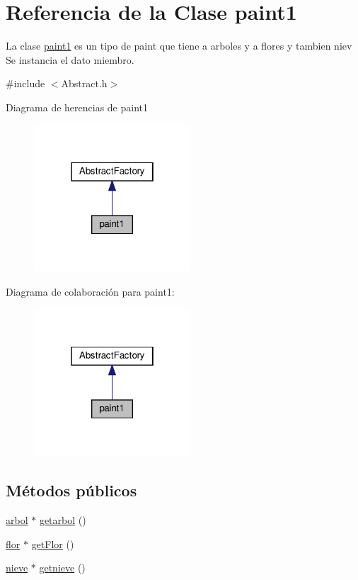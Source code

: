 \hypertarget{classpaint1}{}\section{Referencia de la Clase paint1}
\label{classpaint1}


La clase \hyperlink{classpaint1}{paint1} es un tipo de paint que tiene a arboles y a flores y tambien niev  Se instancia el dato miembro.  




{\ttfamily \#include $<$Abstract.\+h$>$}



Diagrama de herencias de paint1
\nopagebreak
\begin{figure}[H]
\begin{center}
\leavevmode
\includegraphics[width=166pt]{classpaint1__inherit__graph}
\end{center}
\end{figure}


Diagrama de colaboración para paint1\+:
\nopagebreak
\begin{figure}[H]
\begin{center}
\leavevmode
\includegraphics[width=166pt]{classpaint1__coll__graph}
\end{center}
\end{figure}
\subsection*{Métodos públicos}
\begin{DoxyCompactItemize}
\item 
\hyperlink{classarbol}{arbol} $\ast$ \hyperlink{classpaint1_a249b589508df7acb5e763abd1cae42c2}{getarbol} ()
\item 
\hyperlink{classflor}{flor} $\ast$ \hyperlink{classpaint1_ae5bf28220e7c9b9f8ce361de3feb5f39}{get\+Flor} ()
\item 
\hyperlink{classnieve}{nieve} $\ast$ \hyperlink{classpaint1_a402a3a74abf9644ba7a19fbb0e97ea4f}{getnieve} ()
\end{DoxyCompactItemize}


